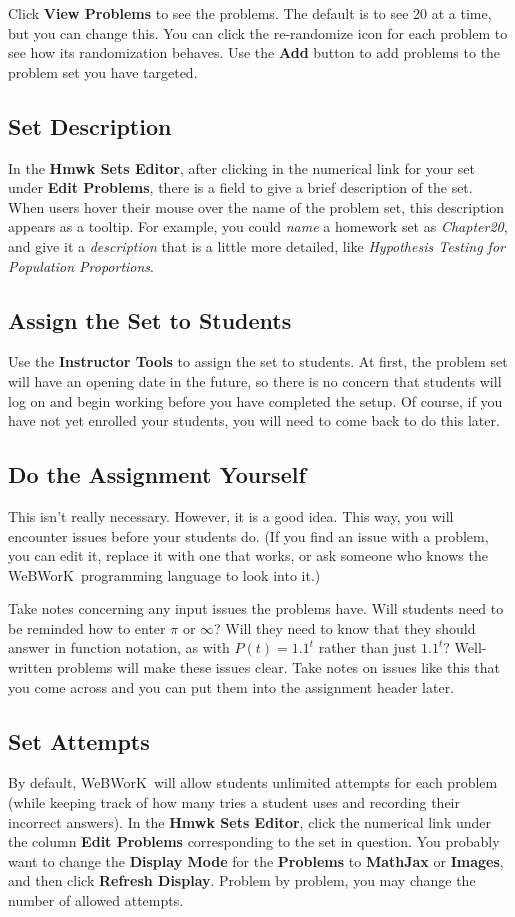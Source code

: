 \documentclass[12pt]{article}
\newcommand{\menu}[1]{\textbf{#1}}
\newcommand{\WW}{WeBWorK}
\newcommand{\HSE}{\menu{Hmwk Sets Editor}}
\begin{document}
Click \menu{View Problems} to see the problems.
The default is to see 20 at a time, but you can change this.
You can click the re-randomize icon for each problem to see how its randomization behaves.
Use the \menu{Add} button to add problems to the problem set you have targeted.

\subsection{Set Description}
In the \HSE, after clicking in the numerical link for your set under \menu{Edit Problems}, there is a field to give a brief description of the set.
When users hover their mouse over the name of the problem set, this description appears as a tooltip.
For example, you could \emph{name} a homework set as \emph{Chapter20}, and give it a \emph{description} that is a little more detailed, like \emph{Hypothesis Testing for Population Proportions}.

\subsection{Assign the Set to Students}
Use the \menu{Instructor Tools} to assign the set to students.
At first, the problem set will have an opening date in the future, so there is no concern that students will log on and begin working before you have completed the setup.
Of course, if you have not yet enrolled your students, you will need to come back to do this later.

\subsection{Do the Assignment Yourself}
This isn't really necessary.
However, it is a good idea.
This way, you will encounter issues before your students do.
(If you find an issue with a problem, you can edit it, replace it with one that works, or ask someone who knows the \WW\ programming language to look into it.)

Take notes concerning any input issues the problems have.
Will students need to be reminded  how to enter $\pi$ or $\infty$?
Will they need to know that they should answer in function notation, as with $P(t)=1.1^t$ rather than just $1.1^t$?
Well-written problems will make these issues clear.
Take notes on issues like this that you come across and you can put them into the assignment header later.

\subsection{Set Attempts}
By default, \WW\ will allow students unlimited attempts for each problem (while keeping track of how many tries a student uses and recording their incorrect answers).
In the \HSE, click the numerical link under the column \menu{Edit Problems} corresponding to the set in question.
You probably want to change the \menu{Display Mode} for the \menu{Problems} to \menu{MathJax} or \menu{Images}, and then click \menu{Refresh Display}.
Problem by problem, you may change the number of allowed attempts.
\end{document}
